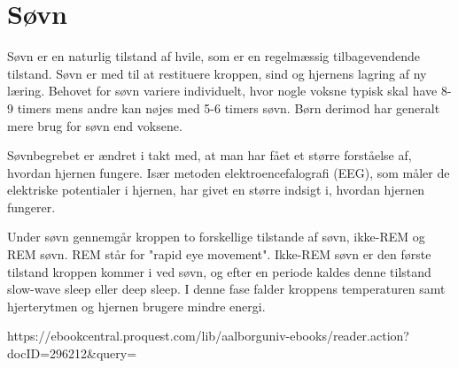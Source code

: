 \section{Søvn}\label{sec:Soevn_generelt}
Søvn er en naturlig tilstand af hvile, som er en regelmæssig tilbagevendende tilstand. Søvn er med til at restituere kroppen, sind og hjernens lagring af ny læring. Behovet for søvn variere individuelt, hvor nogle voksne typisk skal have 8-9 timers mens andre kan nøjes med 5-6 timers søvn. Børn derimod har generalt mere brug for søvn end voksene. 

Søvnbegrebet er ændret i takt med, at man har fået et større forståelse af, hvordan hjernen fungere. Især metoden elektroencefalografi (EEG), som måler de elektriske potentialer i hjernen, har givet en større indsigt i, hvordan hjernen fungerer.

Under søvn gennemgår kroppen to forskellige tilstande af søvn, ikke-REM og REM søvn. REM står for "rapid eye movement". Ikke-REM søvn er den første tilstand kroppen kommer i ved søvn, og efter en periode kaldes denne tilstand slow-wave sleep eller deep sleep. I denne fase falder kroppens temperaturen samt hjerterytmen og hjernen brugere mindre energi.   


https://ebookcentral.proquest.com/lib/aalborguniv-ebooks/reader.action?docID=296212&query=